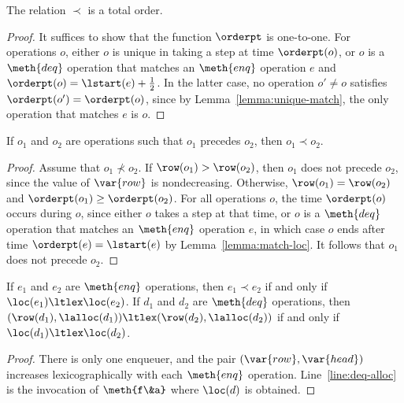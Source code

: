 \begin{lemma}
\label{lemma:total-order}
The relation $\prec$ is a total order. 
\end{lemma}
\begin{proof}
It suffices to show that the function $\orderpt$ is one-to-one. 
For operations $o$, 
either $o$ is unique in taking a step at time $\orderpt(o)$, 
or $o$ is a $\meth{deq}$ operation 
that matches an $\meth{enq}$ operation $e$ 
and $\orderpt(o) = \lstart(e) + \frac{1}{2}$. 
In the latter case, 
no operation $o' \neq o$ satisfies $\orderpt(o') = \orderpt(o)$, 
since by Lemma~\ref{lemma:unique-match}, 
the only operation that matches $e$ is $o$. 
\end{proof}

\begin{lemma}
\label{lemma:precedes}
If $o_1$ and $o_2$ are operations such that $o_1$ precedes $o_2$, 
then $o_1 \prec o_2$. 
\end{lemma}
\begin{proof}
Assume that $o_1 \not\prec o_2$. 
If $\row(o_1) > \row(o_2)$, then $o_1$ does not precede $o_2$, 
since the value of $\var{row}$ is nondecreasing. 
Otherwise, $\row(o_1) = \row(o_2)$ and $\orderpt(o_1) \ge \orderpt(o_2)$. 
For all operations $o$, 
the time $\orderpt(o)$ occurs during $o$, 
since either $o$ takes a step at that time, 
or $o$ is a $\meth{deq}$ operation 
that matches an $\meth{enq}$ operation $e$, 
in which case $o$ ends after time $\orderpt(e) = \lstart(e)$ 
by Lemma~\ref{lemma:match-loc}. 
It follows that $o_1$ does not precede $o_2$. 
\end{proof}

\begin{lemma}
\label{lemma:loc-order}
If $e_1$ and $e_2$ are $\meth{enq}$ operations, 
then $e_1 \prec e_2$ if and only if $\loc(e_1) \ltlex \loc(e_2)$. 
If $d_1$ and $d_2$ are $\meth{deq}$ operations, 
then $(\row(d_1), \lalloc(d_1)) \ltlex (\row(d_2), \lalloc(d_2))$ 
if and only if $\loc(d_1) \ltlex \loc(d_2)$. 
\end{lemma}
\begin{proof}
There is only one enqueuer, 
and the pair $(\var{row}, \var{head})$ 
increases lexicographically with each $\meth{enq}$ operation. 
Line~\ref{line:deq-alloc} is the invocation of $\meth{f\&a}$ 
where $\loc(d)$ is obtained. 
\end{proof}

